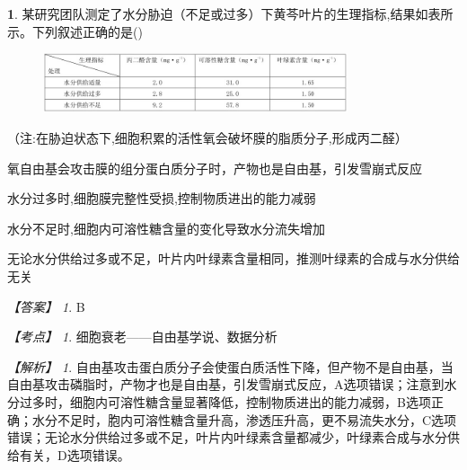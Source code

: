 \documentclass[UTF8, 10pt, a4paper, oneside]{ctexart}
\theoremstyle{definition}
\newtheorem{exercise}{}
\theoremstyle{remark}
\newtheorem*{answer}{【答案】}
\newtheorem*{point}{【考点】}      %
\newtheorem*{explanation}{【解析】}     %
\theoremstyle{plain}
\begin{document}
\begin{exercise}
    某研究团队测定了水分胁迫（不足或过多）下黄芩叶片的生理指标,结果如表所示。下列叙述正确的是\quad(\quad)
    \begin{figure}[h!]
        \centering
        \includegraphics[width=0.8\textwidth]{assists/4-1.jpg}
    \end{figure}\vspace{-1em}

    （注:在胁迫状态下,细胞积累的活性氧会破坏膜的脂质分子,形成丙二醛）
    \begin{adjustwidth}{2em}{}
        \begin{asparaenum}[A. ]
            \item 氧自由基会攻击膜的组分蛋白质分子时，产物也是自由基，引发雪崩式反应
            \item 水分过多时,细胞膜完整性受损,控制物质进出的能力减弱
            \item 水分不足时,细胞内可溶性糖含量的变化导致水分流失增加
            \item 无论水分供给过多或不足，叶片内叶绿素含量相同，推测叶绿素的合成与水分供给无关
        \end{asparaenum}
    \end{adjustwidth}
    \begin{answer}
        B
    \end{answer}
    \begin{point}
        细胞衰老——自由基学说、数据分析
    \end{point}
    \begin{explanation}
        自由基攻击蛋白质分子会使蛋白质活性下降，但产物不是自由基，当自由基攻击磷脂时，产物才也是自由基，引发雪崩式反应，A选项错误；注意到水分过多时，细胞内可溶性糖含量显著降低，控制物质进出的能力减弱，B选项正确；水分不足时，胞内可溶性糖含量升高，渗透压升高，更不易流失水分，C选项错误；无论水分供给过多或不足，叶片内叶绿素含量都减少，叶绿素合成与水分供给有关，D选项错误。
    \end{explanation}
\end{exercise}
\end{document}
